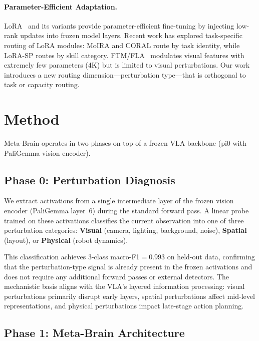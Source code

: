 \documentclass[conference]{article}
\newcommand{\ours}{Meta-Brain}
\begin{document}
\paragraph{Parameter-Efficient Adaptation.}
LoRA~\cite{lora} and its variants provide parameter-efficient fine-tuning by injecting low-rank updates into frozen model layers.
Recent work has explored task-specific routing of LoRA modules: MoIRA and CORAL route by task identity, while LoRA-SP routes by skill category.
FTM/FLA~\cite{ftm} modulates visual features with extremely few parameters (4K) but is limited to visual perturbations.
Our work introduces a new routing dimension---perturbation type---that is orthogonal to task or capacity routing.

\section{Method}

\ours{} operates in two phases on top of a frozen VLA backbone (pi0 with PaliGemma vision encoder).

\subsection{Phase 0: Perturbation Diagnosis}

We extract activations from a single intermediate layer of the frozen vision encoder (PaliGemma layer~6) during the standard forward pass.
A linear probe trained on these activations classifies the current observation into one of three perturbation categories: \textbf{Visual} (camera, lighting, background, noise), \textbf{Spatial} (layout), or \textbf{Physical} (robot dynamics).

This classification achieves 3-class macro-F1$=$0.993 on held-out data, confirming that the perturbation-type signal is already present in the frozen activations and does not require any additional forward passes or external detectors.
The mechanistic basis aligns with the VLA's layered information processing: visual perturbations primarily disrupt early layers, spatial perturbations affect mid-level representations, and physical perturbations impact late-stage action planning.

\subsection{Phase 1: Meta-Brain Architecture}
\end{document}
